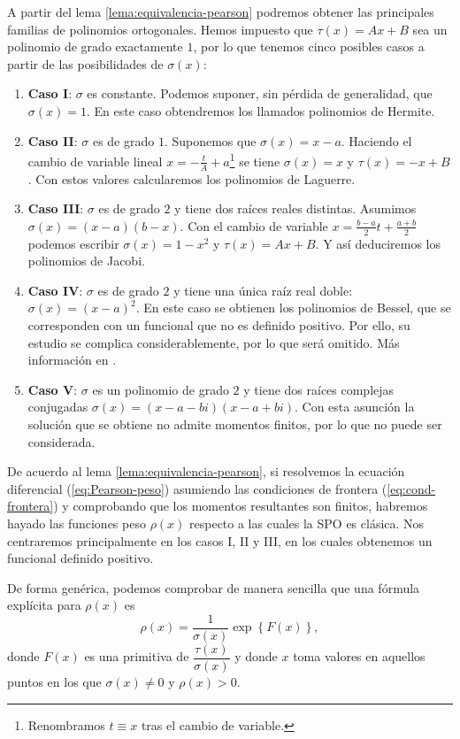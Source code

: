A partir del lema \ref{lema:equivalencia-pearson} podremos obtener las principales familias de polinomios ortogonales. Hemos impuesto que $\tau(x)=Ax+B$ sea un polinomio de grado exactamente $1$, por lo que tenemos cinco posibles casos a partir de las posibilidades de $\sigma(x)$:

\begin{enumerate}
    \item \textbf{Caso I}: $\sigma$ es constante. Podemos suponer, sin pérdida de generalidad, que $\sigma(x) = 1$. En este caso obtendremos los llamados polinomios de Hermite.
    \item \textbf{Caso II}: $\sigma$ es de grado $1$. Suponemos que $\sigma(x) = x-a$. Haciendo el cambio de variable lineal $x = -\frac t A+a$\footnote{Renombramos $t\equiv x$ tras el cambio de variable.} se tiene $\sigma(x) = x$ y $\tau(x)=-x+B$. Con estos valores calcularemos los polinomios de Laguerre.
    \item \textbf{Caso III}: $\sigma$ es de grado $2$ y tiene dos raíces reales distintas. Asumimos $\sigma(x) = (x-a)(b-x)$. Con el cambio de variable $x = \frac{b-a}{2}t + \frac{a+b}{2}$ podemos escribir $\sigma(x)=1-x^2$ y $\tau(x)=Ax+B$. Y así deduciremos los polinomios de Jacobi.
    \item \textbf{Caso IV}: $\sigma$ es de grado $2$ y tiene una única raíz real doble: $\sigma(x) = (x-a)^2$. En este caso se obtienen los polinomios de Bessel, que se corresponden con un funcional que no es definido positivo. Por ello, su estudio se complica considerablemente, por lo que será omitido. Más información en \cite{Bessel-polynomials}.  
    \item \textbf{Caso V}: $\sigma$ es un polinomio de grado $2$ y tiene dos raíces complejas conjugadas \linebreak $\sigma(x) = (x-a-bi)(x-a+bi)$. Con esta asunción la solución que se obtiene no admite momentos finitos, por lo que no puede ser considerada.
\end{enumerate}

De acuerdo al lema \ref{lema:equivalencia-pearson}, si resolvemos la ecuación diferencial (\ref{eq:Pearson-peso}) asumiendo las condiciones de frontera (\ref{eq:cond-frontera}) y comprobando que los momentos resultantes son finitos, habremos hayado las funciones peso $\rho(x)$ respecto a las cuales la SPO es clásica. Nos centraremos principalmente en los casos I, II y III, en los cuales obtenemos un funcional definido positivo.

De forma genérica, podemos comprobar de manera sencilla que una fórmula explícita para $\rho(x)$ es
\begin{equation}
    \label{eq:rho-general}
    \rho(x) = \dfrac{1}{\sigma(x)}\exp\left\{F(x)\right\},
\end{equation}
donde $F(x)$ es una primitiva de $\dfrac{\tau(x)}{\sigma(x)}$ y donde $x$ toma valores en aquellos puntos en los que $\sigma(x)\neq 0$ y $\rho(x)>0$.

